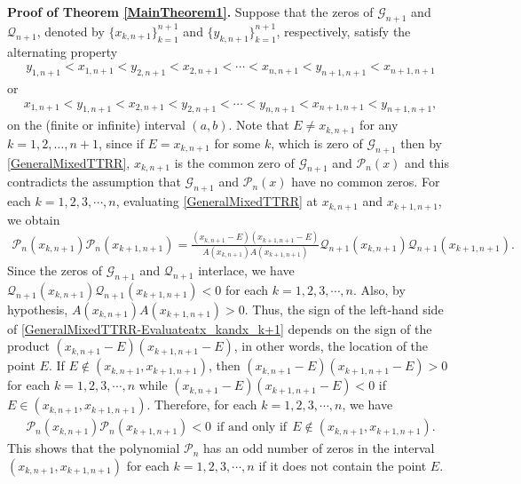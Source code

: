 \documentclass[final,3p,times,12pt]{elsarticle}
\numberwithin{equation}{section}  %
\begin{document}
{\bf{Proof of Theorem \ref{MainTheorem1}.}} Suppose that the zeros of $\mathcal{G}_{n+1}$ and $\mathcal{Q}_{n+1}$, denoted by $\{x_{k,n+1}\}_{k=1}^{n+1}$ and $\{y_{k,n+1}\}_{k=1}^{n+1}$, respectively, satisfy the alternating property
\begin{align}\label{Interlace1withsamedegree}
	y_{1,n+1}<x_{1,n+1}<y_{2,n+1}<x_{2,n+1}<\cdots<x_{n,n+1}<y_{n+1,n+1}<x_{n+1,n+1}
\end{align}
or 
\begin{align}\label{Interlace2withsamedegree}
	x_{1,n+1}<y_{1,n+1}<x_{2,n+1}<y_{2,n+1}<\cdots<y_{n,n+1}<x_{n+1,n+1}<y_{n+1,n+1},
\end{align}
on the (finite or infinite) interval $(a,b)$. 
Note that $E\neq x_{k,n+1}$ for any $k=1,2,\dots,n+1$, since if $E=x_{k,n+1}$ for some $k$, which is zero of $\mathcal{G}_{n+1}$ then by \eqref{GeneralMixedTTRR}, $x_{k,n+1}$ is the common zero of $\mathcal{G}_{n+1}$ and $\mathcal{P}_n(x)$ and this contradicts the assumption that $\mathcal{G}_{n+1}$ and $\mathcal{P}_n(x)$ have no common zeros.
For each $k=1,2,3,\cdots,n$, evaluating \eqref{GeneralMixedTTRR} at $x_{k,n+1}$ and $x_{k+1,n+1}$, we obtain
\begin{align}\label{GeneralMixedTTRR-Evaluateatx_kandx_k+1}
	\mathcal{P}_n(x_{k,n+1})	\mathcal{P}_n(x_{k+1,n+1})=\frac{(x_{k,n+1}-E)(x_{k+1,n+1}-E)}{A(x_{k,n+1})A(x_{k+1,n+1})} \mathcal{Q}_{n+1}(x_{k,n+1})\mathcal{Q}_{n+1}(x_{k+1,n+1}).
\end{align}
Since the zeros of $\mathcal{G}_{n+1}$ and $\mathcal{Q}_{n+1}$ interlace, we have $\mathcal{Q}_{n+1}(x_{k,n+1})\mathcal{Q}_{n+1}(x_{k+1,n+1})<0$ for each $k=1,2,3,\cdots,n$. Also, by hypothesis, $A(x_{k,n+1})A(x_{k+1,n+1})>0$. Thus, the sign of the left-hand side of \eqref{GeneralMixedTTRR-Evaluateatx_kandx_k+1} depends on the sign of the product $(x_{k,n+1}-E)(x_{k+1,n+1}-E)$, in other words, the location of the point $E$. If $E\not \in (x_{k,n+1}, x_{k+1,n+1})$, then $(x_{k,n+1}-E)(x_{k+1,n+1}-E)>0$ for each $k=1,2,3,\cdots,n$ while $(x_{k,n+1}-E)(x_{k+1,n+1}-E)<0$ if $E\in (x_{k,n+1}, x_{k+1,n+1})$. Therefore, for each $k=1,2,3,\cdots,n$, we have 
\begin{align}\label{product-Pn-negative-in-interval}
	\mathcal{P}_n(x_{k,n+1})	\mathcal{P}_n(x_{k+1,n+1})<0~~  \text{if and only if} ~~E\not \in (x_{k,n+1}, x_{k+1,n+1}).
\end{align}
This shows that the polynomial $\mathcal{P}_n$ has an odd number of zeros in the interval $(x_{k,n+1},x_{k+1,n+1})$ for each $k=1,2,3,\cdots,n$ if it does not contain the point $E$. 
\end{document}
